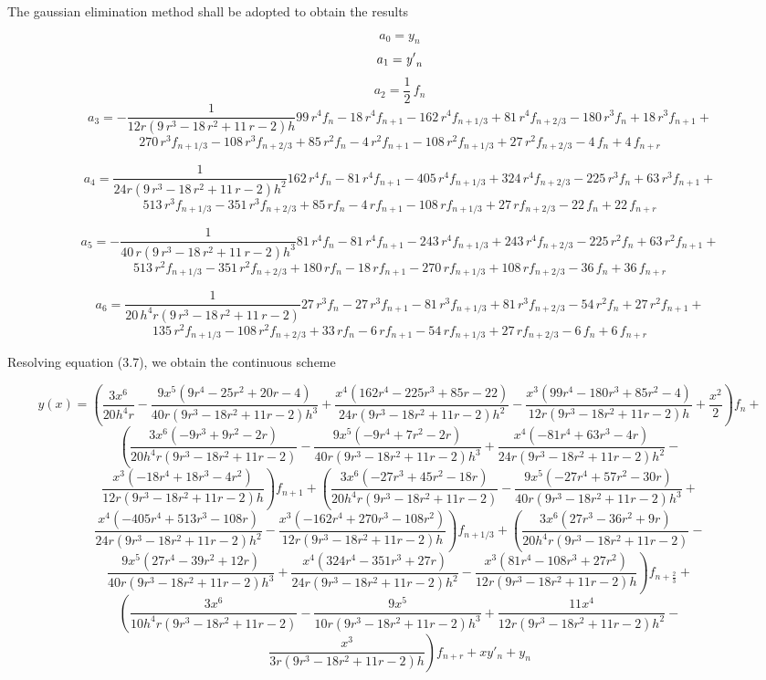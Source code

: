 \documentclass[12pt]{article}
\begin{document}
\noindent The gaussian elimination method shall be adopted to obtain the results

$$a_{{0}}=y_{{n}}$$
$$a_{{1}}={\it y'}_{{n}}$$
$$a_{{2}}=\frac{1}{2}\,f_{{n}}$$
$$a_{{3}}=-\frac{1}{12r \left( 9\,{r}^{3}-18\,{r}^{2}+11\,r-2\right) h}99\,{r}^{4}f_{{n}}-18\,{r}^{4}f_{{n+1}}-162\,{r}^{4}f_{{n+1/3}}+81\,{r}^{4}f_{{n+2/3}}-180\,{r}^{3}f_{{n}}+18\,{r}^{3}f_{{n+1}}+$$ $$270\,{r}^{3}f_{{n+1/3}}-108\,{r}^{3}f_{{n+2/3}}+85\,{r}^{2}f_{{n}}-4\,{r}^{2}f_{{n+1}}-108\,{r}^{2}f_{{n+1/3}}+27\,{r}^{2}f_{{n+2/3}}-4\,f_{{n}}+4\,f_{{n+r}}$$

$$a_{{4}}=\frac{1}{24{r\left(9\,{r}^{3}-18\,{r}^{2}+11\,r-2 \right) {h}^{2}}}162\,{r}^{4}f_{{n}}-81\,{r}^{4}f_{{n+1}}-405\,{r}^{4}f_{{n+1/3}}+324\,{r}^{4}f_{{n+2/3}}-225\,{r}^{3}f_{{n}}+63\,{r}^{3}f_{{n+1}}+$$ $$513\,{r}^{3}f_{{n+1/3}}-351\,{r}^{3}f_{{n+2/3}}+85\,rf_{{n}}-4\,rf_{{n+1}}-108\,rf_{{n+1/3}}+27\,rf_{{n+2/3}}-22\,f_{{n}}+22\,f_{n+r}$$

$$a_{{5}}=-\frac{1}{{40\,r \left( 9\,{r}^{3}-18\,{r}^{2}+11\,r-2 \right) {h}^{3}}}81\,{r}^{4}f_{{n}}-81\,{r}^{4}f_{{n+1}}-243\,{r}^{4}f_{{n+1/3}}+243\,{r}^{4}f_{{n+2/3}}-225\,{r}^{2}f_{{n}}+63\,{r}^{2}f_{{n+1}}+$$
$$513\,{r}^{2}f_{{n+1/3}}-351\,{r}^{2}f_{{n+2/3}}+180\,rf_{{n}}-18\,rf_{{n+1}}-270\,rf_{{n+1/3}}+108\,rf_{{n+2/3}}-36\,f_{{n}}+36\,f_{{n+r}}$$
	
$$a_{{6}}=\frac{1}{20\,{h}^{4}r \left( 9\,{r}^{3}-18\,{r}^{2}+11\,r-2 \right)}27\,{r}^{3}f_{{n}}-27\,{r}^{3}f_{{n+1}}-81\,{r}^{3}f_{{n+1/3}}+81\,{r}^{3}f_{{n+2/3}}-54\,{r}^{2}f_{{n}}+27\,{r}^{2}f_{{n+1}}+$$ $$135\,{r}^{2}f_{{n+1/3}}-108\,{r}^{2}f_{{n+2/3}}+33\,rf_{{n}}-6\,rf_{{n+1}}-54\,rf_{{n+1/3}}+27\,rf_{{n+2/3}}-6\,f_{{n}}+6\,f_{{n+r}}$$

\noindent Resolving equation (3.7), we obtain the continuous scheme

$$y(x)=\left(\frac{3x^6}{20 h^4r}-\frac{9x^5(9r^4 - 25r^2 + 20r - 4)}{40r(9r^3 - 18r^2 + 11r - 2)h^3}+\frac{x^4(162r^4 - 225r^3 + 85r - 22)}{24r(9r^3 - 18r^2 + 11r - 2)h^2}-\frac{x^3(99r^4 - 180r^3 + 85r^2 - 4)}{12r(9r^3 - 18r^2 + 11r - 2)h}+\frac{x^2}{2}\right)f_n+$$
$$\left(\frac{3x^6(-9r^3 + 9r^2 - 2r)}{20h^4r(9r^3 - 18r^2 + 11r - 2)}-\frac{9x^5(-9r^4 + 7r^2 - 2r)}{40r(9r^3 - 18r^2 + 11r - 2)h^3}+\frac{x^4(-81r^4 + 63r^3 - 4r)}{24r(9r^3 - 18r^2 + 11r - 2)h^2}-\right.$$ $$\left.\frac{x^3(-18r^4 + 18r^3 - 4r^2)}{12r(9r^3 - 18r^2 + 11r - 2)h}\right)f_{n + 1}+\left(\frac{3x^6(-27r^3 + 45r^2 - 18r)}{20h^4r(9r^3 - 18r^2 + 11r - 2)}-\frac{9x^5(-27r^4 + 57r^2 - 30r)}{40r(9r^3 - 18r^2 + 11r - 2)h^3}+\right.$$ $$\left.\frac{x^4(-405r^4 + 513r^3 - 108r)}{24r(9r^3 - 18r^2 + 11r - 2)h^2}-\frac{x^3(-162r^4 + 270r^3 - 108r^2)}{12r(9r^3 - 18r^2 + 11r - 2)h}\right)f_{n + 1/3}+\left(\frac{3x^6(27r^3 - 36r^2 + 9r)}{20h^4r(9r^3 - 18r^2 + 11r - 2)}-\right.$$ $$\left.\frac{9x^5(27r^4 - 39r^2 + 12r)}{40r(9r^3 - 18r^2 + 11r - 2)h^3}+\frac{x^4(324r^4 - 351r^3 + 27r)}{24r(9r^3 - 18r^2 + 11r - 2)h^2}-\frac{x^3(81r^4 - 108r^3 + 27r^2)}{12r(9r^3 - 18r^2 + 11r - 2)h}\right)f_{n+\frac{2}{3}}+$$
$$\left(\frac{3x^6}{10h^4r(9r^3 - 18r^2 + 11r - 2)}-\frac{9x^5}{10r(9r^3 - 18r^2 + 11r - 2)h^3}+\frac{11x^4}{12r(9r^3 - 18r^2 + 11r - 2)h^2}-\right.$$ $$\left.\frac{x^3}{3r(9r^3 - 18r^2 + 11r - 2)h}\right)f_{n+r}+xy'_n+y_n$$
\end{document}
